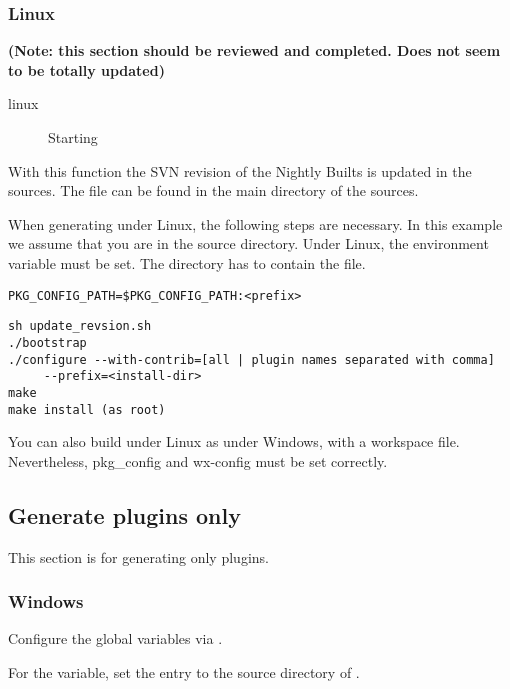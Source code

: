 \subsubsection{Linux}

\textbf{(Note: this section should be reviewed and completed. Does not seem to be totally updated)}

\begin{description}
\item[linux] Starting 
\end{description}

With this function the SVN revision of the Nightly Builts is updated in the sources. The file can be found in the main directory of the \codeblocks sources.

When generating under Linux, the following steps are necessary. In this example we assume that you are in the \codeblocks source directory.  Under Linux, the environment variable  must be set. The  directory has to contain the  file.

\begin{verbatim}
PKG_CONFIG_PATH=$PKG_CONFIG_PATH:<prefix>
\end{verbatim}


\begin{verbatim}
sh update_revsion.sh
./bootstrap
./configure --with-contrib=[all | plugin names separated with comma]
     --prefix=<install-dir>
make
make install (as root)
\end{verbatim}

You can also build under Linux as under Windows, with a workspace file. Nevertheless, pkg\_config and wx-config must be set correctly.

\subsection{Generate plugins only}

This section is for generating only plugins.

\subsubsection{Windows}

Configure the global variables via .


For the  variable, set the  entry to the source directory of \codeblocks.

